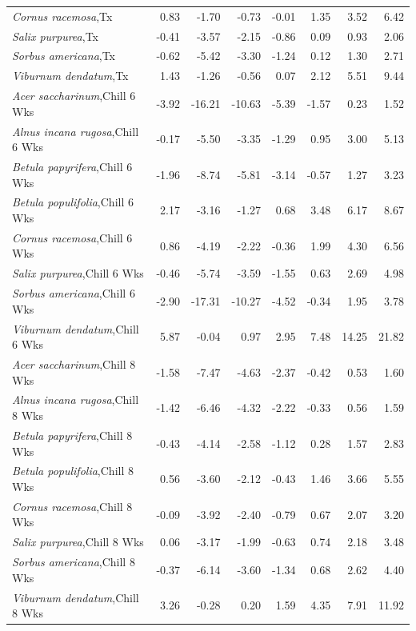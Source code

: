 \documentclass{article}\usepackage[]{graphicx}\usepackage[]{color}
\begin{document}
\begin{longtable}{lrrrrrrr}
  \textit{Cornus racemosa},Tx & 0.83 & -1.70 & -0.73 & -0.01 & 1.35 & 3.52 & 6.42 \\ 
  \textit{Salix purpurea},Tx & -0.41 & -3.57 & -2.15 & -0.86 & 0.09 & 0.93 & 2.06 \\ 
  \textit{Sorbus americana},Tx & -0.62 & -5.42 & -3.30 & -1.24 & 0.12 & 1.30 & 2.71 \\ 
  \textit{Viburnum dendatum},Tx & 1.43 & -1.26 & -0.56 & 0.07 & 2.12 & 5.51 & 9.44 \\ 
  \textit{Acer saccharinum},Chill 6 Wks & -3.92 & -16.21 & -10.63 & -5.39 & -1.57 & 0.23 & 1.52 \\ 
  \textit{Alnus incana rugosa},Chill 6 Wks & -0.17 & -5.50 & -3.35 & -1.29 & 0.95 & 3.00 & 5.13 \\ 
  \textit{Betula papyrifera},Chill 6 Wks & -1.96 & -8.74 & -5.81 & -3.14 & -0.57 & 1.27 & 3.23 \\ 
  \textit{Betula populifolia},Chill 6 Wks & 2.17 & -3.16 & -1.27 & 0.68 & 3.48 & 6.17 & 8.67 \\ 
  \textit{Cornus racemosa},Chill 6 Wks & 0.86 & -4.19 & -2.22 & -0.36 & 1.99 & 4.30 & 6.56 \\ 
  \textit{Salix purpurea},Chill 6 Wks & -0.46 & -5.74 & -3.59 & -1.55 & 0.63 & 2.69 & 4.98 \\ 
  \textit{Sorbus americana},Chill 6 Wks & -2.90 & -17.31 & -10.27 & -4.52 & -0.34 & 1.95 & 3.78 \\ 
  \textit{Viburnum dendatum},Chill 6 Wks & 5.87 & -0.04 & 0.97 & 2.95 & 7.48 & 14.25 & 21.82 \\ 
  \textit{Acer saccharinum},Chill 8 Wks & -1.58 & -7.47 & -4.63 & -2.37 & -0.42 & 0.53 & 1.60 \\ 
  \textit{Alnus incana rugosa},Chill 8 Wks & -1.42 & -6.46 & -4.32 & -2.22 & -0.33 & 0.56 & 1.59 \\ 
  \textit{Betula papyrifera},Chill 8 Wks & -0.43 & -4.14 & -2.58 & -1.12 & 0.28 & 1.57 & 2.83 \\ 
  \textit{Betula populifolia},Chill 8 Wks & 0.56 & -3.60 & -2.12 & -0.43 & 1.46 & 3.66 & 5.55 \\ 
  \textit{Cornus racemosa},Chill 8 Wks & -0.09 & -3.92 & -2.40 & -0.79 & 0.67 & 2.07 & 3.20 \\ 
  \textit{Salix purpurea},Chill 8 Wks & 0.06 & -3.17 & -1.99 & -0.63 & 0.74 & 2.18 & 3.48 \\ 
  \textit{Sorbus americana},Chill 8 Wks & -0.37 & -6.14 & -3.60 & -1.34 & 0.68 & 2.62 & 4.40 \\ 
  \textit{Viburnum dendatum},Chill 8 Wks & 3.26 & -0.28 & 0.20 & 1.59 & 4.35 & 7.91 & 11.92 \\ 

\end{longtable}
\end{document}
